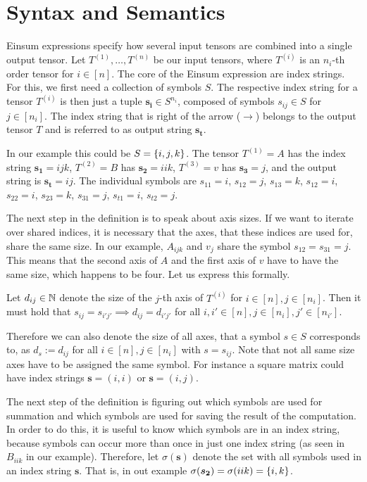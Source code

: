 \section{Syntax and Semantics}

\begin{definition}
    Einsum expressions specify how several input tensors are combined into a single output tensor.
    Let $T^{(1)},\dots,T^{(n)}$ be our input tensors,
    where $T^{(i)}$ is an $n_i$-th order tensor for $i \in [n]$.
    The core of the Einsum expression are index strings. For this, we first need a collection of symbols $S$.
    The respective index string for a tensor $T^{(i)}$ is then just a tuple $\bm{s_i} \in S^{n_i}$,
    composed of symbols $s_{ij} \in S$ for $j \in [n_i]$.
    The index string that is right of the arrow ($\rightarrow$) belongs to the output tensor $T$ and is referred to as output string $\bm{s_t}$.

    In our example this could be $S = \lbrace i,j,k \rbrace$.
    The tensor $T^{(1)} = A$ has the index string $\bm{s_1} = ijk$,
    $T^{(2)} = B$ has $\bm{s_2} = iik$,
    $T^{(3)} = v$ has $\bm{s_3} = j$,
    and the output string is $\bm{s_t} = ij$.
    The individual symbols are $s_{11} = i$, $s_{12} = j$, $s_{13} = k$, $s_{12} = i$, $s_{22} = i$, $s_{23} = k$, $s_{31} = j$, $s_{t1} = i$, $s_{t2} = j$.

    The next step in the definition is to speak about axis sizes.
    If we want to iterate over shared indices, it is necessary that the axes, that these indices are used for, share the same size.
    In our example, $A_{ijk}$ and $v_j$ share the symbol $s_{12} = s_{31} = j$.
    This means that the second axis of $A$ and the first axis of $v$ have to have the same size, which happens to be four.
    Let us express this formally.

    Let $d_{ij} \in \mathbb{N}$ denote the size of the $j$-th axis of $T^{(i)}$ for $i \in [n], j \in [n_i]$.
    Then it must hold that $s_{ij} = s_{i'j'} \implies d_{ij} = d_{i'j'}$ for all $i,i' \in [n], j \in [n_i], j' \in [n_{i'}]$.

    Therefore we can also denote the size of all axes, that a symbol $s \in S$ corresponds to, as $d_s := d_{ij}$ for all $i \in [n], j \in [n_i]$ with $s = s_{ij}$.
    Note that not all same size axes have to be assigned the same symbol. For instance a square matrix could have index strings $\bm{s} = (i, i)$ or $\bm{s} = (i, j)$.

    The next step of the definition is figuring out which symbols are used for summation and which symbols are used for saving the result of the computation.
    In order to do this, it is useful to know which symbols are in an index string, because symbols can occur more than once in just one index string (as seen in $B_{iik}$ in our example).
    Therefore, let $\sigma(\bm{s})$ denote the set with all symbols used in an index string $\bm{s}$.
    That is, in out example $\sigma(\bm{s_2}) = \sigma(iik) = \lbrace i, k \rbrace$.


\end{definition}
